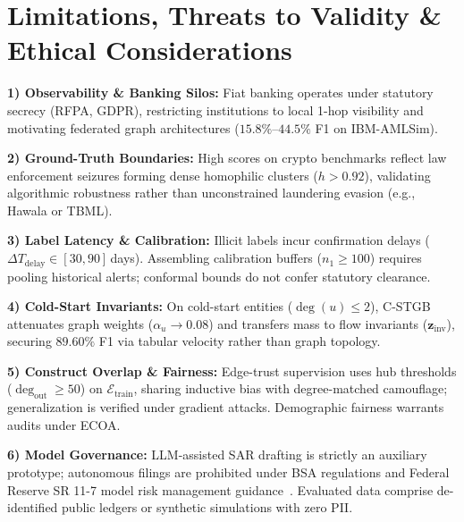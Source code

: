 \section{Limitations, Threats to Validity \& Ethical Considerations}
\label{sec:limitations}
\noindent\textbf{1) Observability \& Banking Silos:} Fiat banking operates under statutory secrecy (RFPA, GDPR), restricting institutions to local 1-hop visibility and motivating federated graph architectures ($15.8\%$--$44.5\%$ F1 on IBM-AMLSim).\par\vspace{0.2ex}
\noindent\textbf{2) Ground-Truth Boundaries:} High scores on crypto benchmarks reflect law enforcement seizures forming dense homophilic clusters ($h > 0.92$), validating algorithmic robustness rather than unconstrained laundering evasion (e.g., Hawala or TBML).\par\vspace{0.2ex}
\noindent\textbf{3) Label Latency \& Calibration:} Illicit labels incur confirmation delays ($\Delta T_{\text{delay}} \in [30, 90]$\,days). Assembling calibration buffers ($n_1 \ge 100$) requires pooling historical alerts; conformal bounds do not confer statutory clearance.\par\vspace{0.2ex}
\noindent\textbf{4) Cold-Start Invariants:} On cold-start entities ($\deg(u) \le 2$), C-STGB attenuates graph weights ($\alpha_u \to 0.08$) and transfers mass to flow invariants ($\mathbf{z}_{\text{inv}}$), securing $89.60\%$ F1 via tabular velocity rather than graph topology.\par\vspace{0.2ex}
\noindent\textbf{5) Construct Overlap \& Fairness:} Edge-trust supervision uses hub thresholds ($\deg_{\text{out}} \ge 50$) on $\mathcal{E}_{\text{train}}$, sharing inductive bias with degree-matched camouflage; generalization is verified under gradient attacks. Demographic fairness warrants audits under ECOA.\par\vspace{0.2ex}
\noindent\textbf{6) Model Governance:} LLM-assisted SAR drafting is strictly an auxiliary prototype; autonomous filings are prohibited under BSA regulations and Federal Reserve SR 11-7 model risk management guidance~\cite{fed2011sr117}. Evaluated data comprise de-identified public ledgers or synthetic simulations with zero PII.\par
